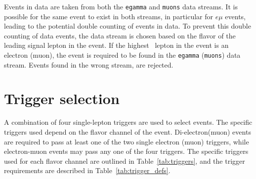 Events in data are taken from both the \texttt{egamma} and \texttt{muons} data
streams.
It is possible for the same event to exist in both streams, in particular for
$e\mu$ events, leading to the potential double counting of events in data.
To prevent this double counting of data events, the data stream is chosen based
on the flavor of the leading signal lepton in the event.
If the highest \pt\ lepton in the event is an electron (muon), the event is
required to be found in the \texttt{egamma} (\texttt{muons}) data stream.
Events found in the wrong stream, are rejected.

\FloatBarrier
\section{Trigger selection}
\label{sec:trigger_selection}

A combination of four single-lepton triggers are used to select events.
The specific triggers used depend on the flavor channel of the event.
Di-electron(muon) events are required to pass at least one of the two single
electron (muon) triggers, while electron-muon events may pass any one of the
four triggers.
The specific triggers used for each flavor channel are outlined in
Table~\ref{tab:triggers}, and the trigger requirements are described in
Table~\ref{tab:trigger_defs}.

\begin{table}[ht]
  \caption[Trigger selection for each final state.]{Trigger selection for each final state. If the event passes any of
    the triggers for the given final state, the event is accepted.
  }
  \label{tab:triggers}
\end{table}

